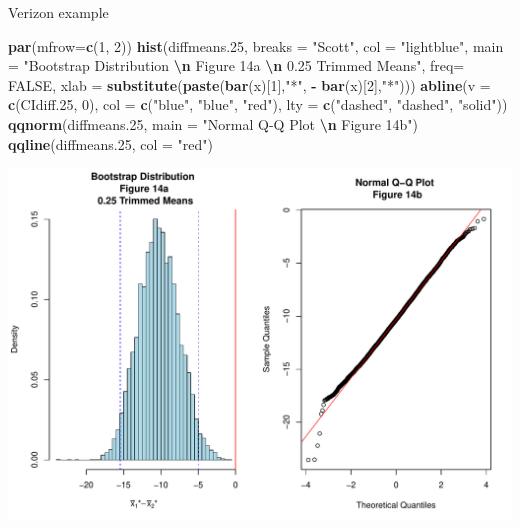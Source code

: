 \documentclass[
  ignorenonframetext,
]{beamer}
\newenvironment{Shaded}{\begin{snugshade}}{\end{snugshade}}
\newcommand{\AttributeTok}[1]{\textcolor[rgb]{0.13,0.29,0.53}{#1}}
\newcommand{\ConstantTok}[1]{\textcolor[rgb]{0.56,0.35,0.01}{#1}}
\newcommand{\DecValTok}[1]{\textcolor[rgb]{0.00,0.00,0.81}{#1}}
\newcommand{\FloatTok}[1]{\textcolor[rgb]{0.00,0.00,0.81}{#1}}
\newcommand{\FunctionTok}[1]{\textcolor[rgb]{0.13,0.29,0.53}{\textbf{#1}}}
\newcommand{\NormalTok}[1]{#1}
\newcommand{\SpecialCharTok}[1]{\textcolor[rgb]{0.81,0.36,0.00}{\textbf{#1}}}
\newcommand{\StringTok}[1]{\textcolor[rgb]{0.31,0.60,0.02}{#1}}
\begin{document}
\begin{frame}[fragile]{Verizon example}
\protect\hypertarget{verizon-example-10}{}
\tiny

\begin{Shaded}
\begin{Highlighting}[]
\FunctionTok{par}\NormalTok{(}\AttributeTok{mfrow=}\FunctionTok{c}\NormalTok{(}\DecValTok{1}\NormalTok{, }\DecValTok{2}\NormalTok{))}
\FunctionTok{hist}\NormalTok{(diffmeans}\FloatTok{.25}\NormalTok{, }\AttributeTok{breaks =} \StringTok{"Scott"}\NormalTok{, }\AttributeTok{col =} \StringTok{"lightblue"}\NormalTok{, }
     \AttributeTok{main =} \StringTok{"Bootstrap Distribution }\SpecialCharTok{\textbackslash{}n}\StringTok{ Figure 14a }\SpecialCharTok{\textbackslash{}n}\StringTok{ 0.25 Trimmed Means"}\NormalTok{, }
     \AttributeTok{freq=} \ConstantTok{FALSE}\NormalTok{, }\AttributeTok{xlab =} \FunctionTok{substitute}\NormalTok{(}\FunctionTok{paste}\NormalTok{(}\FunctionTok{bar}\NormalTok{(x)[}\DecValTok{1}\NormalTok{],}\StringTok{"*"}\NormalTok{, }\SpecialCharTok{{-}} \FunctionTok{bar}\NormalTok{(x)[}\DecValTok{2}\NormalTok{],}\StringTok{"*"}\NormalTok{)))}
\FunctionTok{abline}\NormalTok{(}\AttributeTok{v =} \FunctionTok{c}\NormalTok{(CIdiff}\FloatTok{.25}\NormalTok{, }\DecValTok{0}\NormalTok{), }\AttributeTok{col =} \FunctionTok{c}\NormalTok{(}\StringTok{"blue"}\NormalTok{, }\StringTok{"blue"}\NormalTok{, }\StringTok{"red"}\NormalTok{), }
       \AttributeTok{lty =} \FunctionTok{c}\NormalTok{(}\StringTok{"dashed"}\NormalTok{, }\StringTok{"dashed"}\NormalTok{, }\StringTok{"solid"}\NormalTok{))}
\FunctionTok{qqnorm}\NormalTok{(diffmeans}\FloatTok{.25}\NormalTok{, }\AttributeTok{main =} \StringTok{"Normal Q{-}Q Plot }\SpecialCharTok{\textbackslash{}n}\StringTok{ Figure 14b"}\NormalTok{)}
\FunctionTok{qqline}\NormalTok{(diffmeans}\FloatTok{.25}\NormalTok{, }\AttributeTok{col =} \StringTok{"red"}\NormalTok{)}
\end{Highlighting}
\end{Shaded}

\begin{center}\includegraphics[width=0.6\linewidth,height=0.4\textheight]{Week10A_files/figure-beamer/unnamed-chunk-40-1} \end{center}


\end{frame}
\end{document}
